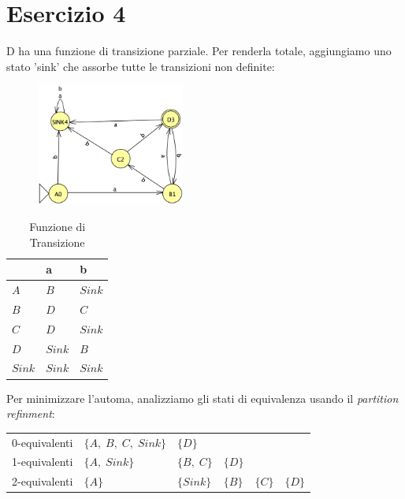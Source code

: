 \documentclass[11pt]{article}
\begin{document}
\section*{Esercizio 4}
\cal D ha una funzione di transizione parziale. Per renderla totale, aggiungiamo uno stato 'sink' che assorbe tutte le transizioni non definite:

\begin{multicols}{2}
  \begin{figure}[H]
    \centering
    \includegraphics[height=4cm]{img/04DFAsink.png}
    \label{fig:04-DFA-sink}
  \end{figure}
  
  \begin{table}[H]
    \centering
    \begin{tabularx}{\linewidth}{|>{\centering\arraybackslash}X|>{\centering\arraybackslash}X|>{\centering\arraybackslash}X|}
    \hline
    & \textbf{a} & \textbf{b}  \\
    \hline
    $A$ & $B$ & $Sink$ \\
    \hline
    $B$ & $D$ & $C$ \\
    \hline
    $C$ & $D$ & $Sink$ \\
    \hline
    $D$ & $Sink$ & $B$ \\
    \hline
    $Sink$ & $Sink$ & $Sink$ \\
    \hline
    \end{tabularx}
    \label{tab:04-funzione-transazione}
    \caption*{\small Funzione di Transizione}
  \end{table}
\end{multicols}

\noindent Per minimizzare l'automa, analizziamo gli stati di equivalenza usando il \textit{partition refinment}:

\begin{table}[H]
  \small
  \centering
  \begin{tabularx}{\linewidth}{l l l l l l}
  0-equivalenti & $\{A,\;B,\;C,\;Sink\}$ & $\{D\}$ & & & \\
  1-equivalenti & $\{A,\;Sink\}$ & $\{B,\;C\}$ & $\{D\}$ & & \\
  2-equivalenti & $\{A\}$ & $\{Sink\}$ & $\{B\}$ & $\{C\}$ & $\{D\}$ \\
  \end{tabularx}
  \label{tab:04-partition-refinment}
\end{table}
\end{document}
